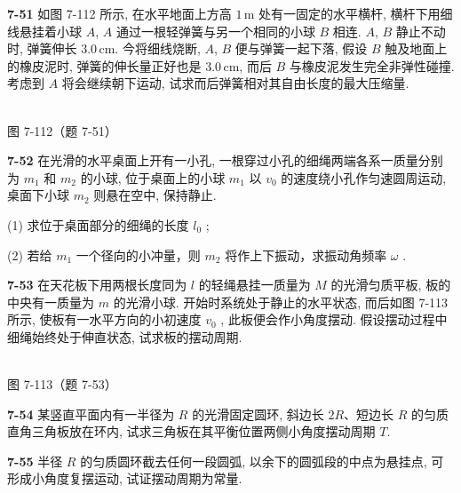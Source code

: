 \newpage

\textbf{7-51} 如图 7-112 所示, 在水平地面上方高 $1\,\mathrm m$ 处有一固定的水平横杆, 横杆下用细线悬挂着小球 $A$, $A$ 通过一根轻弹簧与另一个相同的小球 $B$ 相连. $A$, $B$ 静止不动时, 弹簧伸长 $3.0\,\mathrm{cm}$. 今将细线烧断, $A$, $B$ 便与弹簧一起下落, 假设 $B$ 触及地面上的橡皮泥时, 弹簧的伸长量正好也是 $3.0\,\mathrm{cm}$, 而后 $B$ 与橡皮泥发生完全非弹性碰撞. 考虑到 $A$ 将会继续朝下运动, 试求而后弹簧相对其自由长度的最大压缩量.

\begin{center}
\resizebox{0.38\textwidth}{!}{}\\[4pt]
{\small 图 7-112（题 7-51）}
\end{center}

\newpage

\textbf{7-52} 在光滑的水平桌面上开有一小孔, 一根穿过小孔的细绳两端各系一质量分别为 $m_{1}$ 和 $m_{2}$ 的小球, 位于桌面上的小球 $m_{1}$ 以 $v_{0}$ 的速度绕小孔作匀速圆周运动, 桌面下小球 $m_{2}$ 则悬在空中, 保持静止.

(1) 求位于桌面部分的细绳的长度 $l_{0}$ ;

(2) 若给 $m_{1}$ 一个径向的小冲量，则 $m_{2}$ 将作上下振动，求振动角频率 $\omega$ .

\newpage

\textbf{7-53} 在天花板下用两根长度同为 $l$ 的轻绳悬挂一质量为 $M$ 的光滑匀质平板, 板的中央有一质量为 $m$ 的光滑小球. 开始时系统处于静止的水平状态, 而后如图 7-113 所示, 使板有一水平方向的小初速度 $v_{0}$ , 此板便会作小角度摆动. 假设摆动过程中细绳始终处于伸直状态, 试求板的摆动周期.

\begin{center}
\resizebox{0.40\textwidth}{!}{}\\[4pt]
{\small 图 7-113（题 7-53）}
\end{center}

\newpage

\textbf{7-54} 某竖直平面内有一半径为 $R$ 的光滑固定圆环, 斜边长 $2R$、短边长 $R$ 的匀质直角三角板放在环内, 试求三角板在其平衡位置两侧小角度摆动周期 $T$.

\newpage

\textbf{7-55} 半径 $R$ 的匀质圆环截去任何一段圆弧, 以余下的圆弧段的中点为悬挂点, 可形成小角度复摆运动, 试证摆动周期为常量.

